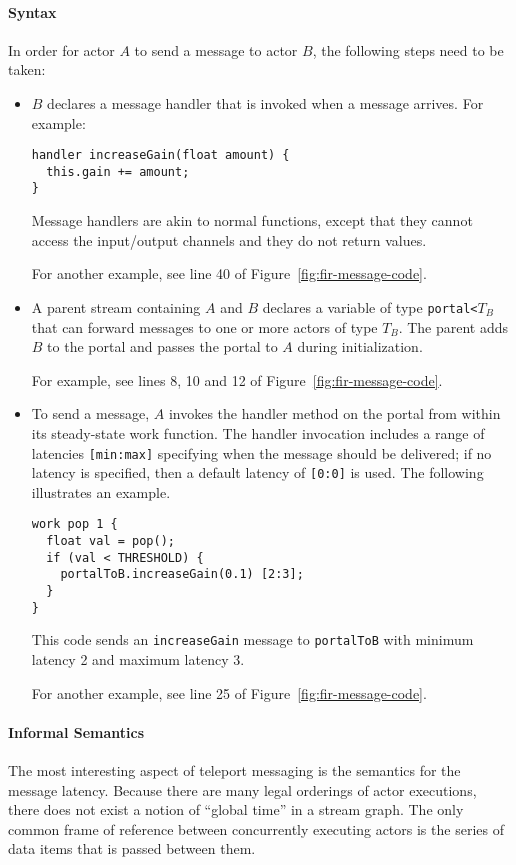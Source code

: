 \documentclass{sig-alternate}
\begin{document}
\paragraph*{Syntax}  In order for actor $A$ to send a message to
actor $B$, the following steps need to be taken:
\begin{itemize}

\item $B$ declares a message handler that is invoked when a
message arrives.  For example: {\small
\vspace{-5pt}
\begin{verbatim}
handler increaseGain(float amount) {
  this.gain += amount;
}
\end{verbatim}
\vspace{-5pt}}
Message handlers are akin to normal functions, except that they
cannot access the input/output channels and they do not return values.

For another example, see line 40 of Figure~\ref{fig:fir-message-code}.

\item A parent stream containing $A$ and $B$ declares a variable of
type {\tt portal<}$T_B$\hspace{-1pt}{\tt >} that can forward messages
to one or more actors of type $T_B$.  The parent adds $B$ to the
portal and passes the portal to $A$ during initialization.

For example, see lines 8, 10 and 12 of Figure~\ref{fig:fir-message-code}.

\item To send a message, $A$ invokes the handler method on the portal
from within its steady-state work function. The handler invocation
includes a range of latencies {\tt [min:max]} specifying when the
message should be delivered; if no latency is specified, then a
default latency of {\tt [0:0]} is used.  The following illustrates an
example.{\small
\vspace{-5pt}
\begin{verbatim}
work pop 1 {
  float val = pop();
  if (val < THRESHOLD) {
    portalToB.increaseGain(0.1) [2:3];
  }
}
\end{verbatim}\vspace{-5pt}}
This code sends an {\tt increaseGain} message to {\tt portalToB} with
minimum latency 2 and maximum latency 3.

For another example, see line 25 of Figure~\ref{fig:fir-message-code}.
\end{itemize}
\paragraph*{Informal Semantics} The most interesting aspect of teleport
messaging is the semantics for the message latency.  Because there
are many legal orderings of actor executions, there does not exist a
notion of ``global time'' in a stream graph.  The only common frame of
reference between concurrently executing actors is the series of data
items that is passed between them.
\end{document}
